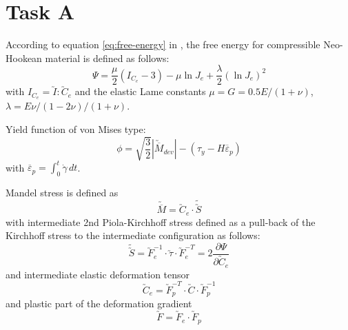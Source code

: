 \section{Task A}
\label{sec:task-a}

According to equation \eqref{eq:free-energy} in \cite{Bonet2008}, the free energy
for compressible Neo-Hookean material is defined as follows:
\begin{equation} \tag{6.27}
  \label{eq:free-energy}
  \Psi = \frac{\mu}{2} \left( I_{C_{e}} - 3 \right) - \mu \ln J_{e} +
  \frac{\lambda}{2} \left( \ln J_{e} \right)^{2}
\end{equation}
with \(I_{C_{e}} = \utilde{I} : \utilde{C}_{e} \) and the elastic Lame constants
\(\mu = G = 0.5 E / (1+\nu)\), \(\lambda = E \nu / (1 - 2\nu) / (1+\nu)\).

Yield function of von Mises type:
\begin{equation}
  \label{eq:yield_func}
  \phi = \sqrt{\frac{3}{2}} \left| \utilde{\overline{M}}_{dev} \right|- 
    \left( \tau_{y} - H \overline{\varepsilon}_{p} \right)
\end{equation}
with \(\overline{\varepsilon}_{p} = \int_{0}^{t} \dot{\gamma} \, dt\).

Mandel stress is defined as
\begin{equation}
  \label{eq:mandel}
  \utilde{\overline{M}} = \utilde{C}_{e} \cdot \widetilde{\utilde{S}}
\end{equation}
with intermediate 2nd Piola-Kirchhoff stress defined as a pull-back of the
Kirchhoff stress to the intermediate configuration as follows:
\begin{equation}
  \label{eq:PK2int}
  \widetilde{\utilde{S}} = \utilde{F}_{e}^{-1} \cdot \utilde{\tau} \cdot
  \utilde{F}_{e}^{-T} = 2 \frac{\partial \Psi}{\partial \utilde{C}_{e}}
\end{equation}
and intermediate elastic deformation tensor
\begin{equation}
  \label{eq:Cint}
  \utilde{C}_{e} = \utilde{F}_{p}^{-T} \cdot \utilde{C} \cdot \utilde{F}_{p}^{-1}
\end{equation}
and plastic part of the deformation gradient
\begin{equation}
  \label{eq:F}
  \utilde{F} = \utilde{F}_{e} \cdot \utilde{F}_{p}
\end{equation}

